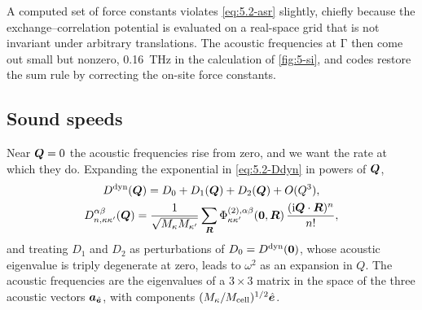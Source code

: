 A computed set of force constants violates \cref{eq:5.2-asr} slightly, chiefly because the exchange--correlation potential is evaluated on a real-space grid that is not invariant under arbitrary translations. The acoustic frequencies at $\mathrm{\Gamma}$ then come out small but nonzero, \SI{0.16}{THz} in the calculation of \cref{fig:5-si}, and codes restore the sum rule by correcting the on-site force constants.

\subsection{Sound speeds}

Near $\bm{Q} = 0$ the acoustic frequencies rise from zero, and we want the rate at which they do. Expanding the exponential in \cref{eq:5.2-Ddyn} in powers of $\bm{Q}$,
\begin{equation}
  \begin{gathered}
  D^{\mathrm{dyn}}(\bm{Q}) = D_0 + D_1(\bm{Q}) + D_2(\bm{Q}) + O(Q^3) , \\
  D^{\alpha\beta}_{n,\kappa\kappa'}(\bm{Q}) = \frac{1}{\sqrt{M_\kappa M_{\kappa'}}}\sum_{\bm{R}}\Phi^{(2),\alpha\beta}_{\kappa\kappa'}(\bm{0},\bm{R})\,\frac{(\mathrm{i}\bm{Q}\cdot\bm{R})^n}{n!} ,
  \end{gathered}
  \label{eq:5.2-Dexp}
\end{equation}
and treating $D_1$ and $D_2$ as perturbations of $D_0 = D^{\mathrm{dyn}}(\bm{0})$, whose acoustic eigenvalue is triply degenerate at zero, leads to $\omega^2$ as an expansion in $Q$. The acoustic frequencies are the eigenvalues of a $3\times3$ matrix in the space of the three acoustic vectors $\bm{a}_{\hat{\bm{e}}}$, with components $(M_\kappa/M_{\mathrm{cell}})^{1/2}\hat{\bm{e}}$.

